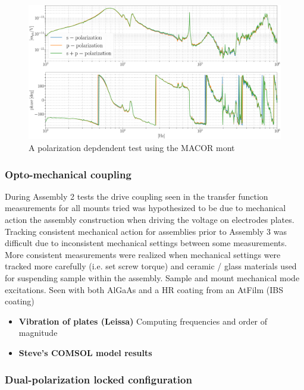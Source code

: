 \begin{figure}[H]
    \includegraphics[width=\textwidth]{figs/ALGAAS/results_figs/assembly3/petgmsvv64.pdf}
    \caption{A polarization depdendent test using the MACOR mont}
    \label{fig:measurement_sum}
\end{figure}

\subsubsection{Opto-mechanical coupling}
During Assembly 2 tests the drive coupling seen in the transfer function measurements for all mounts tried was hypothesized to be due to mechanical action the assembly construction when driving the voltage on electrodes plates. Tracking consistent mechanical action for assemblies prior to Assembly 3 was difficult due to inconsistent mechanical settings between some measurements. More consistent measurements were realized when mechanical settings were tracked more carefully (i.e. set screw torque) and ceramic / glass materials used for suspending sample within the assembly. 
Sample and mount mechanical mode excitations. Seen with both AlGaAs and a HR coating from an AtFilm (IBS coating)
\begin{itemize}
\item \textbf{Vibration of plates (Leissa)} \cite{leissa} Computing frequencies and order of magnitude
\item \textbf{Steve's COMSOL model results}
\end{itemize}

\subsubsection{Dual-polarization locked configuration}

